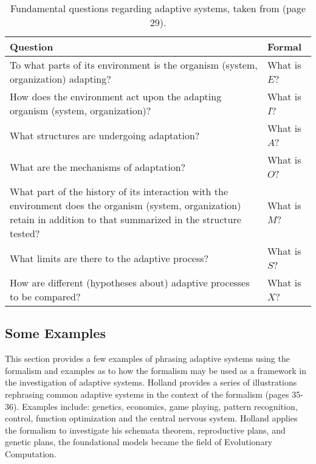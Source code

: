 \documentclass[a4paper, 11pt]{article}
\begin{document}
\begin{table}[ht]
	\centering\small
		\begin{tabularx}{\textwidth}{Xl}
		\toprule
		\textbf{Question} & \textbf{Formal} \\ 
		\toprule
		To what parts of its environment is the organism (system, organization) adapting? & What is $E$? \\ 
		\midrule
		How does the environment act upon the adapting organism (system, organization)? & What is $I$? \\ 
		\midrule
		What structures are undergoing adaptation? & What is $A$? \\ 
		\midrule
		What are the mechanisms of adaptation? & What is $O$? \\ 
		\midrule
		What part of the history of its interaction with the environment does the organism (system, organization) retain in addition to that summarized in the structure tested? & What is $M$? \\ 
		\midrule
		What limits are there to the adaptive process? & What is $S$? \\ 
		\midrule
		How are different (hypotheses about) adaptive processes to be compared? & What is $X$? \\ 
		\bottomrule
		\end{tabularx}	
	\caption{Fundamental questions regarding adaptive systems, taken from \cite{Holland1975} (page 29).}
	\label{tab:adaptsys:questions}
\end{table}


\subsection{Some Examples}
This section provides a few examples of phrasing adaptive systems using the formalism and examples as to how the formalism may be used as a framework in the investigation of adaptive systems. Holland provides a series of illustrations rephrasing common adaptive systems in the context of the formalism \cite{Holland1975} (pages 35-36). Examples include: genetics, economics, game playing, pattern recognition, control, function optimization and the central nervous system. Holland applies the formalism to investigate his schemata theorem, reproductive plans, and genetic plans, the foundational models became the field of Evolutionary Computation. 
\end{document}
